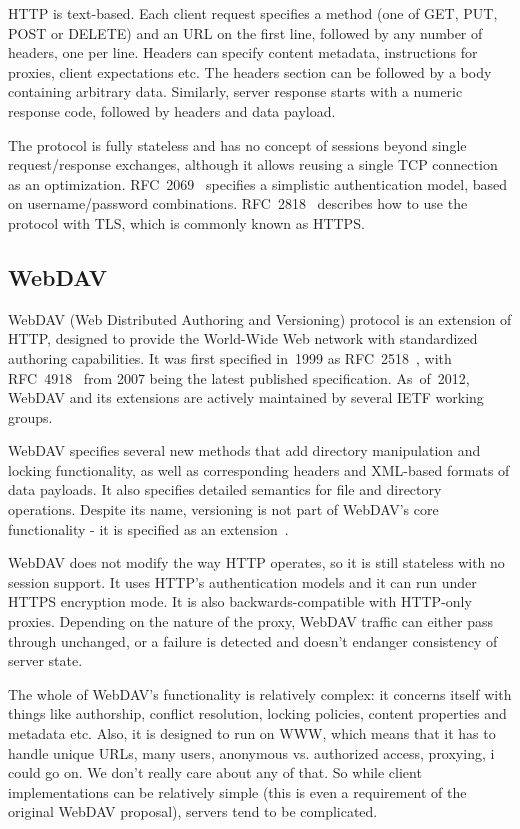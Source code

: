HTTP is text-based. Each client request specifies a method (one of GET, PUT, POST or DELETE) and an URL on the
first line, followed by any number of headers, one per line.  Headers can specify content metadata,
instructions for proxies, client expectations etc. The headers section can be followed by a body containing
arbitrary data. Similarly, server response starts with a numeric response code, followed by headers and data
payload.

The protocol is fully stateless and has no concept of sessions beyond single request/response exchanges,
although it allows reusing a single TCP connection as an optimization.  RFC~2069~\cite{rfc2069} specifies a
simplistic authentication model, based on username/password combinations. RFC~2818~\cite{rfc2818} describes
how to use the protocol with TLS, which is commonly known as HTTPS.

\subsection{WebDAV}

WebDAV (Web Distributed Authoring and Versioning) protocol is an extension of HTTP, designed to provide the
World-Wide Web network with standardized authoring capabilities. It was first specified in~1999 as
RFC~2518~\cite{rfc2518}, with RFC~4918~\cite{rfc4918} from 2007 being the latest published specification.
As~of~2012, WebDAV and its extensions are actively maintained by several IETF working groups.

WebDAV specifies several new methods that add directory manipulation and locking functionality, as well as
corresponding headers and XML-based formats of data payloads. It also specifies detailed semantics for file
and directory operations. Despite its name, versioning is not part of WebDAV's core functionality - it is
specified as an extension~\cite{rfc3253}.

WebDAV does not modify the way HTTP operates, so it is still stateless with no session support. It uses HTTP's
authentication models and it can run under HTTPS encryption mode. It is also backwards-compatible with
HTTP-only proxies. Depending on the nature of the proxy, WebDAV traffic can either pass through unchanged, or
a failure is detected and doesn't endanger consistency of server state.

The whole of WebDAV's functionality is relatively complex: it concerns itself with things like authorship,
conflict resolution, locking policies, content properties and metadata etc. Also, it is designed to run on
WWW, which means that it has to handle unique URLs, many users, anonymous vs. authorized access, proxying, i
could go on. We don't really care about any of that. So while client implementations can be relatively simple
(this is even a requirement of the original WebDAV proposal), servers tend to be complicated.

